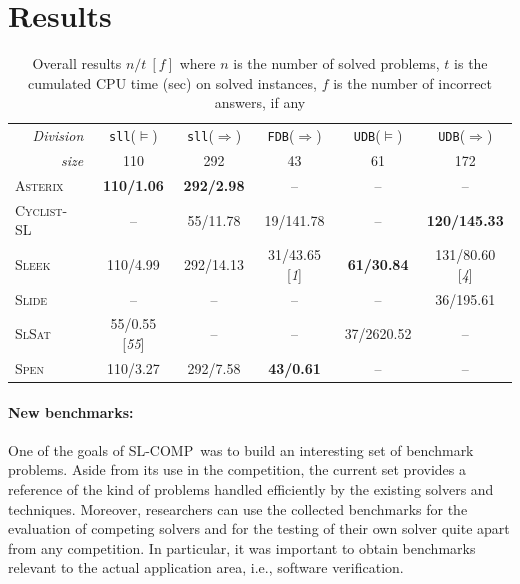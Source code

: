 \documentclass[twoside,11pt]{article}
\newcommand{\limp}{\Rightarrow}
\newcommand{\sllsat}{\texttt{sll}($\models$)}
\newcommand{\sllent}{\texttt{sll}($\limp$)}
\newcommand{\FDBent}{\texttt{FDB}($\limp$)}
\newcommand{\UDBsat}{\texttt{UDB}($\models$)}
\newcommand{\UDBent}{\texttt{UDB}($\limp$)}
\newcommand{\ASTERIX}{\textsc{Asterix}}
\newcommand{\CYCLIST}{\textsc{Cyclist-SL}}
\newcommand{\SLEEK}{\textsc{Sleek}}
\newcommand{\SLIDE}{\textsc{Slide}}
\newcommand{\SLSAT}{\textsc{SlSat}}
\newcommand{\SPEN}{\textsc{Spen}}
\newcommand{\slcomp}{\textsf{SL-COMP}}
\begin{document}
\section{Results}

\begin{table}
\begin{center}
\begin{tabular}{l*{5}c}\hline
\multicolumn{1}{r}{\emph{Division}} & \sllsat & \sllent & \FDBent & \UDBsat & \UDBent \\
\multicolumn{1}{r}{\emph{size}} & 110 & 292 & 43 & 61 & 172 \\
\hline
\ASTERIX &
\textbf{110/1.06} &  %
\textbf{292/2.98} &  %
-- &
-- &
--
\\\hline
\CYCLIST &
-- &
55/11.78 & %
19/141.78 & %
-- &
\textbf{120/145.33} %
\\\hline
\SLEEK &
110/4.99 & %
292/14.13 & %
31/43.65 [\emph{1}] & %
\textbf{61/30.84} & %
131/80.60 [\emph{4}] %
\\\hline
\SLIDE &
-- &
-- &
-- &
-- &
36/195.61 %
\\\hline
\SLSAT &
55/0.55 [\emph{55}] & %
--  &
--  &
37/2620.52 & %
--
\\\hline
\SPEN &
110/3.27 & %
292/7.58 & %
\textbf{43/0.61} & %
-- &
--
\\\hline
\end{tabular}
\end{center}
\caption{%
Overall results $n/t~[f]$ where %
$n$ is the number of solved problems,  %
$t$ is the cumulated CPU time (sec) on solved instances, %
$f$ is the number of incorrect answers, if any %
}
\label{tab:overall}
\vspace{-3eX}
\end{table}


\paragraph{New benchmarks:}
One of the goals of \slcomp\ was to build an interesting set of benchmark problems. 
Aside from its use in the competition, the current set provides a reference of the kind of problems handled efficiently by the existing solvers and techniques.
Moreover, researchers can use the collected benchmarks for the evaluation of competing solvers and for the testing of their own solver quite apart from any competition. 
In particular, it was important to obtain benchmarks relevant to the actual application area, i.e., software verification.
\end{document}
